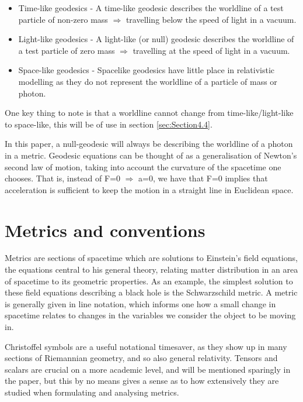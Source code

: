 \documentclass[oneside,openright,frontopenright, singlespacing]{dmathesis}
\begin{document}
\vspace{1em}
\begin{itemize}
  \item Time-like geodesics - A time-like geodesic describes the worldline of a test particle of non-zero mass $\Rightarrow$ travelling below the speed of light in a vacuum.
  \item Light-like geodesics - A light-like (or null) geodesic describes the worldline of a test particle of zero mass $\Rightarrow$ travelling at the speed of light in a vacuum.
  \item Space-like geodesics - Spacelike geodesics have little place in relativistic modelling as they do not represent the worldline of a particle of mass or photon.
\end{itemize}

\vspace{1em}
	One key thing to note is that a worldline cannot change from time-like/light-like to space-like, this will be of use in section \ref{sec:Section4.4}.

\vspace{1em}
	 In this paper, a null-geodesic will always be describing the worldline of a photon in a metric. Geodesic equations can be thought of as a generalisation of Newton's second law of motion, taking into account the curvature of the spacetime one chooses. That is, instead of F=0 $\Rightarrow$ a=0, we have that F=0 implies that acceleration is sufficient to keep the motion in a straight line in Euclidean space.

\section{Metrics and conventions}\label{sec:Section2.3}

\vspace{1em}
	Metrics are sections of spacetime which are solutions to Einstein’s field equations, the equations central to his general theory, relating matter distribution in an area of spacetime to its geometric properties. As an example, the simplest solution to these field equations describing a black hole is the Schwarzschild metric. A metric is generally given in line notation, which informs one how a small change in spacetime relates to changes in the variables we consider the object to be moving in.

\vspace{1em}
	Christoffel symbols are a useful notational timesaver, as they show up in many sections of Riemannian geometry, and so also general relativity. Tensors and scalars are crucial on a more academic level, and will be mentioned sparingly in the paper, but this by no means gives a sense as to how extensively they are studied when formulating and analysing metrics.
\end{document}
